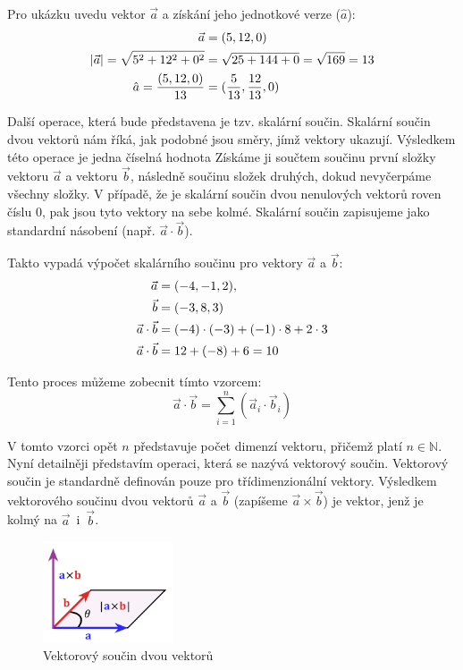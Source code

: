 \documentclass[12pt]{article}
\begin{document}
Pro ukázku uvedu vektor $\vec{a}$ a získání jeho jednotkové verze ($\hat{a}$):
\begin{align}
    \vec{a} &= (5, 12, 0) \notag \\
    |\vec{a}| = \sqrt{5^2 + 12^2 + 0^2} &= \sqrt{25 + 144 + 0} = \sqrt{169} = 13 \notag \\
    \hat{a} = \frac{(5, 12, 0)}{13} &= (\frac{5}{13}, \frac{12}{13}, 0)
\end{align}

Další operace, která bude představena je tzv. skalární součin. Skalární součin dvou vektorů nám říká, jak podobné jsou směry, jímž vektory ukazují. Výsledkem této operace je jedna číselná hodnota Získáme ji součtem součinu první složky vektoru $\vec{a}$ a vektoru $\vec{b}$, následně součinu složek druhých, dokud nevyčerpáme všechny složky. V případě, že je skalární součin dvou nenulových vektorů roven číslu 0, pak jsou tyto vektory na sebe kolmé. Skalární součin zapisujeme jako standardní násobení (např. $\vec{a} \cdot \vec{b}$).

Takto vypadá výpočet skalárního součinu pro vektory $\vec{a}$ a $\vec{b}$:
\begin{align}
    \vec{a} &= (-4, -1, 2), \notag \\
    \vec{b} &= (-3, 8, 3) \notag \\
    \vec{a} \cdot \vec{b} &= (-4) \cdot (-3) + (-1) \cdot 8 + 2 \cdot 3 \notag \\
    \vec{a} \cdot \vec{b} &= 12 + (-8) + 6 = 10
\end{align}

Tento proces můžeme zobecnit tímto vzorcem:
\begin{equation}
    \vec{a} \cdot \vec{b} = \sum_{i=1}^{n}(\vec{a}_i \cdot \vec{b}_i)
\end{equation}

V tomto vzorci opět $n$ představuje počet dimenzí vektoru, přičemž platí $n \in \mathbb{N}$. Nyní detailněji představím operaci, která se nazývá vektorový součin. Vektorový součin je standardně definován pouze pro třídimenzionální vektory. Výsledkem vektorového součinu dvou vektorů $\vec{a}$ a $\vec{b}$ (zapíšeme $\vec{a} \times \vec{b}$) je vektor, jenž je kolmý na $\vec{a}$~i~$\vec{b}$.

\vspace{0.5cm}
\begin{figure}[h]
    \centering
    \includegraphics[height=3cm]{images/cross_product.png}
    \caption[Vektorový součin dvou vektorů]{Vektorový součin dvou vektorů \cite{gui_img}}
    \label{fig:Vektorový součin dvou vektorů}
\end{figure}
\end{document}

